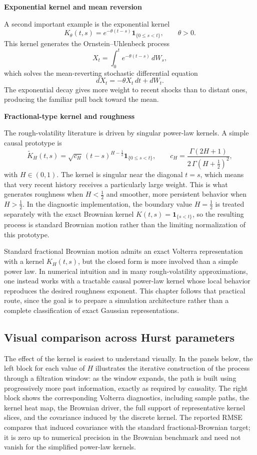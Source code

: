 \textbf{Exponential kernel and mean reversion}

A second important example is the exponential kernel
\[
K_{\theta}(t,s)=e^{-\theta(t-s)}\mathbf{1}_{\{0\le s<t\}},
\qquad \theta>0.
\]
This kernel generates the Ornstein--Uhlenbeck process
\[
X_t=\int_0^t e^{-\theta(t-s)}\,dW_s,
\]
which solves the mean-reverting stochastic differential equation
\[
dX_t=-\theta X_t\,dt + dW_t.
\]
The exponential decay gives more weight to recent shocks than to distant ones, producing the familiar pull back toward the mean.

\textbf{Fractional-type kernel and roughness}

The rough-volatility literature is driven by singular power-law kernels. A simple causal prototype is
\[
\widetilde{K}_H(t,s)
=
\sqrt{c_H}\,(t-s)^{H-\frac12}\mathbf{1}_{\{0\le s<t\}},
\qquad
c_H=\frac{\Gamma(2H+1)}{2\,\Gamma(H+\frac12)^2},
\]
with \(H\in(0,1)\). The kernel is singular near the diagonal \(t=s\), which means that very recent history receives a particularly large weight. This is what generates roughness when \(H<\tfrac12\) and smoother, more persistent behavior when \(H>\tfrac12\). In the diagnostic implementation, the boundary value \(H=\tfrac12\) is treated separately with the exact Brownian kernel \(K(t,s)=\mathbf{1}_{\{s<t\}}\), so the resulting process is standard Brownian motion rather than the limiting normalization of this prototype.

\begin{remark}
Standard fractional Brownian motion admits an exact Volterra representation with a kernel \(K_H(t,s)\), but the closed form is more involved than a simple power law. In numerical intuition and in many rough-volatility approximations, one instead works with a tractable causal power-law kernel whose local behavior reproduces the desired roughness exponent. This chapter follows that practical route, since the goal is to prepare a simulation architecture rather than a complete classification of exact Gaussian representations.
\end{remark}

\subsection{Visual comparison across Hurst parameters}

The effect of the kernel is easiest to understand visually. In the panels below, the left block for each value of \(H\) illustrates the iterative construction of the process through a filtration window: as the window expands, the path is built using progressively more past information, exactly as required by causality. The right block shows the corresponding Volterra diagnostics, including sample paths, the kernel heat map, the Brownian driver, the full support of representative kernel slices, and the covariance induced by the discrete kernel. The reported RMSE compares that induced covariance with the standard fractional-Brownian target; it is zero up to numerical precision in the Brownian benchmark and need not vanish for the simplified power-law kernels.

